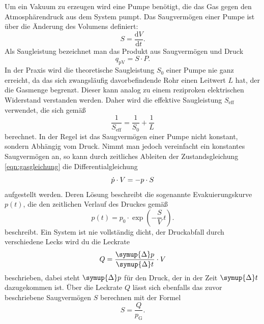 Um ein Vakuum zu erzeugen wird eine Pumpe benötigt, die das Gas gegen den Atmosphärendruck aus dem System pumpt.
Das Saugvermögen einer Pumpe ist über die Änderung des Volumens definiert:
\begin{equation}
    \label{eqn:saugvermoegen}
    S = \frac{\text{d}V}{\text{d}t}.
\end{equation}
Als Saugleistung bezeichnet man das Produkt aus Saugvermögen und Druck
\begin{equation}
    \label{eqn:saugleistung}
    q_{\text{pV}} = S \cdot P.
\end{equation}
In der Praxis wird die theoretische Saugleistung $S_0$ einer Pumpe nie ganz erreicht, da das sich zwangsläufig davorbefindende
Rohr einen Leitwert $L$ hat, der die Gasmenge begrenzt. Dieser kann analog zu einem reziproken elektrischen Widerstand verstanden werden.
Daher wird die effektive Saugleistung $S_{\text{eff}}$ verwendet, die sich gemäß
\begin{equation}
    \label{eqn:saugleistung_eff}
    \frac{1}{S_{\text{eff}}} = \frac{1}{S_{0}} + \frac{1}{L}
\end{equation}
berechnet. In der Regel ist das Saugvermögen einer Pumpe nicht konstant, sondern Abhängig vom Druck.
Nimmt man jedoch vereinfacht ein konstantes Saugvermögen an, so kann durch zeitliches Ableiten der Zustandsgleichung \eqref{eqn:gasgleichung}
die Differentialgleichung
\begin{equation}
    \notag
    \dot{p} \cdot V = -p \cdot S
\end{equation}
aufgestellt werden. Deren Lösung beschreibt die sogenannte Evakuierungskurve $p(t)$, die den zeitlichen Verlauf des Druckes gemäß
\begin{equation}
    \label{eqn:evakuierungskurve}
    p(t) = p_0 \cdot \exp{\left(-\frac{S}{V}\,t\right)}.
\end{equation}
beschreibt.
Ein System ist nie vollständig dicht, der Druckabfall durch verschiedene Lecks wird du die Leckrate
\begin{equation}
    \label{eqn:leckrate}
    Q = \frac{\symup{\Delta} p}{\symup{\Delta} t}\cdot V
\end{equation}
beschrieben, dabei steht $\symup{\Delta} p$ für den Druck, der in der Zeit $\symup{\Delta} t$ dazugekommen ist.
Über die Leckrate $Q$ lässt sich ebenfalls das zuvor beschriebene Saugvermögen $S$ berechnen mit der Formel
\begin{equation}
    \label{eqn:s_leck}
    S = \frac{Q}{p_{\text{G}}}.
\end{equation}
